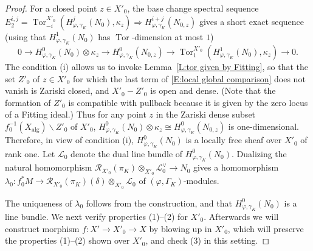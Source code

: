 \documentclass[12pt]{article}
\theoremstyle{definition}
\numberwithin{equation}{theorem}
\newcommand{\calL}{\mathcal{L}}
\newcommand{\calR}{\mathcal{R}}
\newcommand{\alg}{\mathrm{alg}}
\DeclareMathOperator{\Tor}{Tor}
\begin{document}
\begin{proof}
For a closed point $z \in X'_0$, the base change spectral sequence
$E_2^{i,j} = \Tor_{-i}^{X'_0}(H^j_{\varphi,\gamma_K}(N_0), \kappa_z)
\Rightarrow H^{i+j}_{\varphi, \gamma_K}(N_{0,z})$ gives a short exact
sequence (using that $H^1_{\varphi,\gamma_K}(N_0)$ has
$\Tor$-dimension at most $1$)
\begin{equation}
\label{E:local global comparison}
0 \to H^0_{\varphi, \gamma_K}(N_0) \otimes \kappa_z \to H^0_{\varphi, \gamma_K}(N_{0,z}) \to \Tor_1^{X'_0} (H^1_{\varphi, \gamma_K}(N_0), \kappa_z )\to 0.
\end{equation}
The condition (i) allows us to invoke Lemma~\ref{L:tor given by
  Fitting}, so that the set $Z'_0$ of $z \in X'_0$ for which the last
term of \eqref{E:local global comparison} does not vanish is Zariski
closed, and $X'_0-Z'_0$ is open and dense.  (Note that the formation
of $Z'_0$ is compatible with pullback because it is given by the zero
locus of a Fitting ideal.)  Thus for any point $z$ in the Zariski
dense subset $f_0^{-1}(X_\alg) \backslash Z'_0$ of $X'_0$,
$H^0_{\varphi, \gamma_K}(N_0) \otimes \kappa_z \cong H^0_{\varphi,
  \gamma_K}(N_{0,z})$ is one-dimensional.  Therefore, in view of
condition (i), $H^0_{\varphi, \gamma_K}(N_0)$ is a locally free sheaf
over $X'_0$ of rank one.  Let $\calL_0$ denote the dual line bundle of
$H^0_{\varphi, \gamma_K}(N_0)$.  Dualizing the natural homomorphism
$\calR_{X'_0}(\pi_K) \otimes_{X'_0} \calL_0^\vee\to N_0$ gives a
homomorphism $\lambda_0: f_0^*M \to \calR_{X'_0}(\pi_K) (\delta)
\otimes_{X'_0} \calL_0$ of $(\varphi, \Gamma_K)$-modules.

The uniqueness of $\lambda_0$ follows from the construction, and that $H_{\varphi,\gamma_K}^0(N_0)$ is a line bundle.  We next verify properties (1)--(2) for $X'_0$.  Afterwards we will construct morphism $f: X' \to X'_0 \to X$ by blowing up in $X'_0$, which will preserve the properties (1)--(2) shown over $X'_0$, and check (3) in this setting.


\end{proof}
\end{document}
